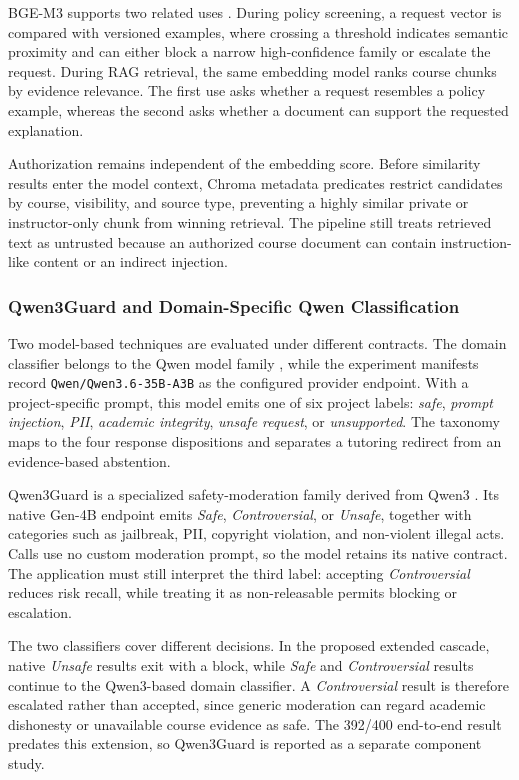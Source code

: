 \documentclass[conference,a4paper]{IEEEtran}
\begin{document}
BGE-M3 supports two related uses \cite{chen2024bgem3}. During policy screening, a request vector is compared with versioned examples, where crossing a threshold indicates semantic proximity and can either block a narrow high-confidence family or escalate the request. During RAG retrieval, the same embedding model ranks course chunks by evidence relevance. The first use asks whether a request resembles a policy example, whereas the second asks whether a document can support the requested explanation.

Authorization remains independent of the embedding score. Before similarity results enter the model context, Chroma metadata predicates restrict candidates by course, visibility, and source type, preventing a highly similar private or instructor-only chunk from winning retrieval. The pipeline still treats retrieved text as untrusted because an authorized course document can contain instruction-like content or an indirect injection.

\subsubsection{Qwen3Guard and Domain-Specific Qwen Classification}

Two model-based techniques are evaluated under different contracts. The domain classifier belongs to the Qwen model family \cite{yang2025qwen3}, while the experiment manifests record \texttt{Qwen/Qwen3.6-35B-A3B} as the configured provider endpoint. With a project-specific prompt, this model emits one of six project labels: \emph{safe}, \emph{prompt injection}, \emph{PII}, \emph{academic integrity}, \emph{unsafe request}, or \emph{unsupported}. The taxonomy maps to the four response dispositions and separates a tutoring redirect from an evidence-based abstention.

Qwen3Guard is a specialized safety-moderation family derived from Qwen3 \cite{zhao2025qwen3guard}. Its native Gen-4B endpoint emits \emph{Safe}, \emph{Controversial}, or \emph{Unsafe}, together with categories such as jailbreak, PII, copyright violation, and non-violent illegal acts. Calls use no custom moderation prompt, so the model retains its native contract. The application must still interpret the third label: accepting \emph{Controversial} reduces risk recall, while treating it as non-releasable permits blocking or escalation.

The two classifiers cover different decisions. In the proposed extended cascade, native \emph{Unsafe} results exit with a block, while \emph{Safe} and \emph{Controversial} results continue to the Qwen3-based domain classifier. A \emph{Controversial} result is therefore escalated rather than accepted, since generic moderation can regard academic dishonesty or unavailable course evidence as safe. The 392/400 end-to-end result predates this extension, so Qwen3Guard is reported as a separate component study.
\end{document}

